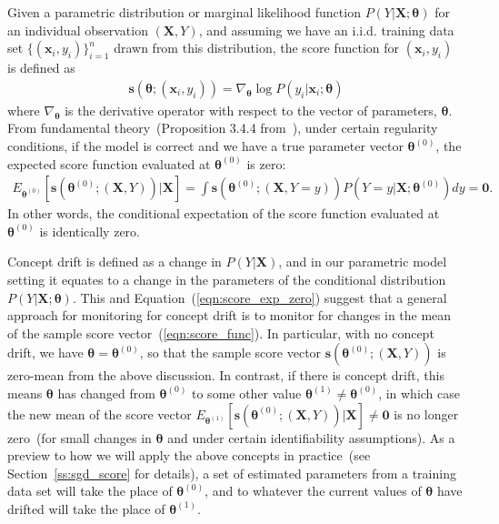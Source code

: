 \documentclass[twoside,11pt]{article}
\begin{document}
Given a parametric distribution or {marginal} likelihood function {$P(Y | \bm {X}; \bm{\theta})$} for an individual observation $(\bm{X}, Y)$, and assuming we have an i.i.d. training data set $\{(\bm {x}_i, y_i)\}_{i=1}^n$ drawn from this distribution, the score function for $ (\bm {x}_i, y_i)$ is defined as 
\begin{align}
\bm{s}(\bm { \theta}; (\bm {x}_i, y_i)) = \nabla _{\bm { \theta}} { \log{P(y_i | \bm {x}_i; \bm{\theta})}}
\label{eqn:score_func}
\end{align}
where $\nabla _{\bm { \theta}}$ is the derivative operator with respect to the vector of parameters, $\bm {\theta}$. From fundamental theory~(Proposition 3.4.4 from~\cite{bickel2015mathematical}), under certain regularity conditions, if the model is correct and we have a true parameter vector {$\bm { \theta} ^{ (0)}$}, the expected score function evaluated at $\bm { \theta} ^{ (0)}$ is zero:
\begin{align}
E_{\bm { \theta} ^{ (0)}}[\bm{s}(\bm { \theta}^{ (0)};(\bm {X}, Y))|\bm {X}] = \int\bm{s}(\bm { \theta}^{ (0)};(\bm {X}, Y=y))P(Y=y|\bm{X};\bm{\theta}^{(0)})dy = \bm{0}.
\label{eqn:score_exp_zero}
\end{align}
In other words, the conditional expectation of the score function evaluated at $\bm { \theta} ^{ (0)}$ is identically zero.

Concept drift is defined as a change in $ P (Y|\bm {X})$, and in our parametric model setting it equates to a change in the parameters of the conditional distribution $P(Y|\bm {X}; \bm { \theta})$. This and Equation~(\ref{eqn:score_exp_zero}) suggest that a general approach for monitoring for concept drift is to monitor for changes in the mean of the sample score vector~(\ref{eqn:score_func}). In particular, with no concept drift, we have $\bm{\theta}=\bm{\theta}^{(0)}$, so that the sample score vector $\bm{s}(\bm { \theta}^{ (0)};(\bm {X}, Y))$ is zero-mean from the above discussion. In contrast, if there is concept drift, this means $\bm{\theta}$ has changed from $\bm{\theta}^{(0)}$ to some other value $\bm{\theta}^{(1)} \neq \bm{\theta}^{(0)}$, in which case the new mean of the score vector $E_{\bm { \theta} ^{ (1)}}[\bm{s}(\bm { \theta}^{ (0)};(\bm {X}, Y))|\bm {X}] \neq \bm{0}$ is no longer zero~(for small changes in $\bm{\theta}$ and under certain identifiability assumptions). As a preview to how we will apply the above concepts in practice~(see Section~\ref{ss:sgd_score} for details), a set of estimated parameters from a training data set will take the place of $\bm { \theta}^{ (0)}$, and to whatever the current values of $\bm{\theta}$ have drifted will take the place of $\bm{\theta}^{(1)}$.
\end{document}
